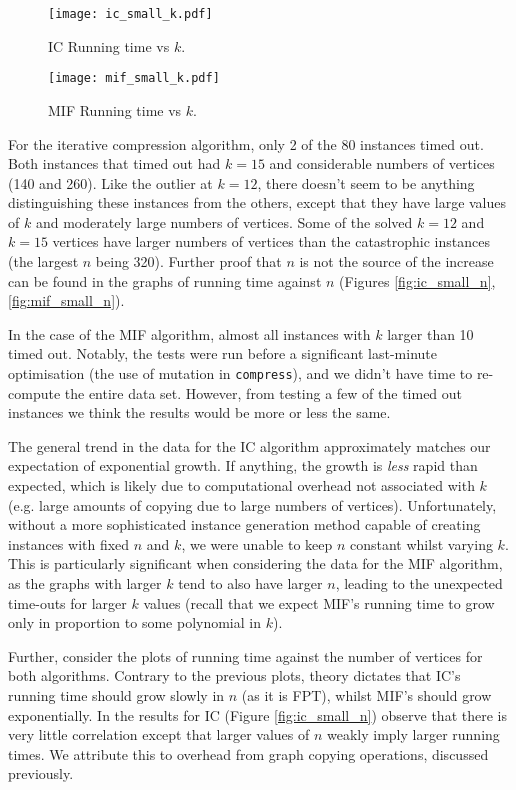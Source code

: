 \documentclass[a4paper,12pt]{article}
\begin{document}
\begin{figure}[h!]
\centering
\texttt{[image: ic\_small\_k.pdf]}
\caption{IC Running time vs $k$.}
\label{fig:ic_small_k}
\end{figure}

\begin{figure}[h!]
\centering
\texttt{[image: mif\_small\_k.pdf]}
\caption{MIF Running time vs $k$.}
\label{fig:mif_small_k}
\end{figure}

\pagebreak

For the iterative compression algorithm, only 2 of the 80 instances timed out. Both instances that timed out had $k = 15$ and considerable numbers of vertices (140 and 260). Like the outlier at $k = 12$, there doesn't seem to be anything distinguishing these instances from the others, except that they have large values of $k$ and moderately large numbers of vertices. Some of the solved $k = 12$ and $k = 15$ vertices have larger numbers of vertices than the catastrophic instances (the largest $n$ being 320). Further proof that $n$ is not the source of the increase can be found in the graphs of running time against $n$ (Figures \ref{fig:ic_small_n}, \ref{fig:mif_small_n}).

In the case of the MIF algorithm, almost all instances with $k$ larger than 10 timed out. Notably, the tests were run before a significant last-minute optimisation (the use of mutation in \texttt{compress}), and we didn't have time to re-compute the entire data set. However, from testing a few of the timed out instances we think the results would be more or less the same.

The general trend in the data for the IC algorithm approximately matches our expectation of exponential growth. If anything, the growth is \textit{less} rapid than expected, which is likely due to computational overhead not associated with $k$ (e.g. large amounts of copying due to large numbers of vertices). Unfortunately, without a more sophisticated instance generation method capable of creating instances with fixed $n$ and $k$, we were unable to keep $n$ constant whilst varying $k$. This is particularly significant when considering the data for the MIF algorithm, as the graphs with larger $k$ tend to also have larger $n$, leading to the unexpected time-outs for larger $k$ values (recall that we expect MIF's running time to grow only in proportion to some polynomial in $k$).

Further, consider the plots of running time against the number of vertices for both algorithms. Contrary to the previous plots, theory dictates that IC's running time should grow slowly in $n$ (as it is FPT), whilst MIF's should grow exponentially. In the results for IC (Figure \ref{fig:ic_small_n}) observe that there is very little correlation except that larger values of $n$ weakly imply larger running times. We attribute this to overhead from graph copying operations, discussed previously.
\end{document}
